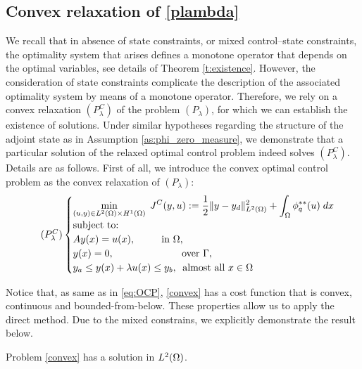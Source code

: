 \subsection{Convex relaxation of \eqref{plambda}}

We recall that in absence of state constraints, or mixed control--state constraints, 
the optimality system that arises defines a monotone operator that depends on 
the optimal variables, see details of Theorem \ref{t:existence}. However, the consideration of state 
constraints complicate the description of the associated optimality system by 
means of a monotone operator. Therefore, we rely on a convex relaxation $(P^C_\lambda)$ of the problem 
$(P_\lambda)$, for which we can establish the existence of solutions. Under similar hypotheses regarding 
the structure of the adjoint state as in Assumption \ref{as:phi_zero_measure}, we demonstrate that a 
particular solution of the relaxed optimal control problem indeed solves $(P^C_\lambda)$. Details are as 
follows. First of all, we introduce the convex optimal control problem as the convex relaxation of $(P_\lambda)$: 
    \begin{equation}\label{convex}\tag{$P^C_{\lambda}$}
    \begin{cases}
    \displaystyle\min_{(u,y)\in L^2(\om)\times H^1(\Omega)} \; J^C(y,u):=\frac{1}{2}\norm{y-y_d}^2_{L^2(\om)}+\int_{\Omega}\phi_q^{**}(u)\; dx\\
    \mbox{subject to:}\\
    Ay(x)=u(x), \phantom{aaaaa} \mbox{in } \om,\\
    y(x)=0, \phantom{aaaaaaaaaaaaa} \mbox{over } \Gamma,\\    
    y_a\le y(x)+\lambda u(x)\le y_b,\phantom{a} \mbox{almost all }x\in \Omega
    \end{cases}
    \end{equation}

Notice that, as same as in \eqref{eq:OCP}, \eqref{convex} has a  cost function that
 is convex, continuous and bounded-from-below. These properties allow us to apply the 
 direct method. Due to the mixed constrains, we explicitly demonstrate the result below.
\begin{lemma}\label{lemma:existence_solution_PClamb}
       Problem \eqref{convex} has a solution in $L^2(\Omega)$.
\end{lemma}
 
